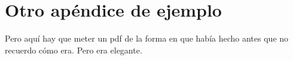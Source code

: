 \chapter{Otro apéndice de ejemplo}

Pero aquí hay que meter un pdf de la forma en que había hecho antes que no recuerdo cómo era. Pero era elegante.

\lipsum[6-7]